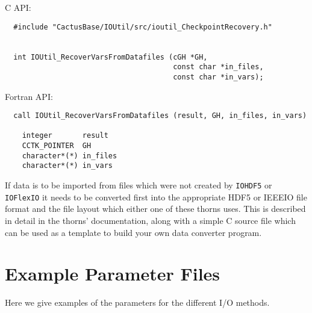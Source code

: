 \documentclass{article}
\begin{document}
C API:
\begin{verbatim}
  #include "CactusBase/IOUtil/src/ioutil_CheckpointRecovery.h"


  int IOUtil_RecoverVarsFromDatafiles (cGH *GH,
                                       const char *in_files,
                                       const char *in_vars);
\end{verbatim}

Fortran API:
\begin{verbatim}
  call IOUtil_RecoverVarsFromDatafiles (result, GH, in_files, in_vars)

    integer       result
    CCTK_POINTER  GH
    character*(*) in_files
    character*(*) in_vars
\end{verbatim}

If data is to be imported from files which were not created by {\tt IOHDF5} or
{\tt IOFlexIO} it needs to be converted first into the appropriate HDF5 or
IEEEIO file format and the file layout which either one of these thorns uses.
This is described in detail in the thorns' documentation, along with a simple C
source file which can be used as a template to build your own data converter
program.


\section{Example Parameter Files}

Here we give examples of the parameters for the different I/O methods.
\end{document}
